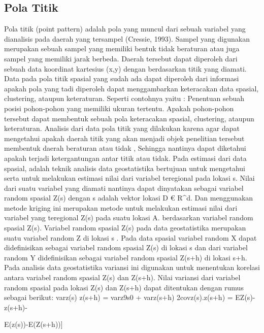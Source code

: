 \begin{enumerate}
\subsection{Pola Titik}
	Pola titik (point pattern) adalah pola yang muncul dari sebuah variabel yang dianalisis pada daerah yang tersampel (Cressie, 1993). Sampel yang digunakan merupakan sebuah sampel yang memiliki bentuk tidak beraturan atau juga sampel yang memiliki jarak berbeda. Daerah tersebut dapat diperoleh dari sebuah data koordinat kartesius (x,y) dengan berdasarkan titik yang diamati. Data pada pola titik spasial yang sudah ada dapat diperoleh dari informasi apakah pola yang tadi diperoleh dapat menggambarkan keteracakan data spasial, clustering, ataupun keteraturan. Seperti contohnya yaitu : Penentuan sebuah posisi pohon-pohon yang memiliki ukuran tertentu. Apakah pohon-pohon tersebut dapat membentuk sebuah pola keteracakan spasial, clustering, ataupun keteraturan. Analisis dari data pola titik yang dilakukan karena agar dapat mengetahui apakah daerah titik yang akan menjadi objek penelitian tersebut membentuk daerah beraturan atau tidak , Sehingga nantinya dapat diketahui apakah terjadi ketergantungan antar titik atau tidak.   
	Pada estimasi dari data spasial, adalah teknik analisis data geostatistika bertujuan untuk mengetahui serta untuk melakukan estimasi nilai dari variabel teregional pada lokasi s. Nilai dari suatu variabel yang diamati nantinya dapat dinyatakan sebagai variabel random spasial  Z(s) dengan s adalah vektor lokasi D € R^d. Dan menggunakan metode kriging ini merupakan metode untuk melakukan estimasi nilai dari variabel yang teregional Z(s) pada suatu lokasi  A. berdasarkan variabel random spasial Z(s). Variabel random spasial  Z(s) pada data geostatistika merupakan suatu variabel random  Z di lokasi s . 
	Pada data spasial variabel random X dapat didefinisikan sebagai variabel random spasial Z(s) di lokasi  s dan dari variabel random Y didefinisikan sebagai variabel random spasial  Z(s+h) di lokasi s+h.  Pada analisis data geostatistika variansi ini digunakan untuk menentukan korelasi antara variabel random spasial Z(s) dan Z(s+h). Nilai variansi dari variabel random spasial pada lokasi Z(s) dan Z(s+h) dapat ditentukan dengan rumus sebagai berikut:
	var{z(s)  z(s+h)} = var{z9s0} + var{z(s+h)} 2cov{z(s).z(s+h)}
			    = E{Z(s)-z(s+h)}-{{E(z(s))-E(Z(s+h))}]


}
\end{enumerate}
